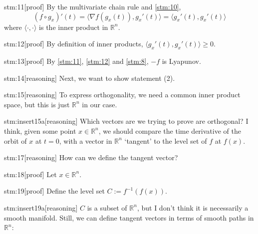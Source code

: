 \begin{stm}{stm:11}[proof]
By the multivariate chain rule and \ref{stm:10}, $$(f \circ g_x)'(t) = \langle \nabla f(g_x(t)), g_x'(t) \rangle = \langle g_x'(t), g_x'(t) \rangle$$ where $\langle \cdot, \cdot \rangle$ is the inner product in $\mathbb{R}^n$. 
\end{stm}

\begin{stm}{stm:12}[proof]
By definition of inner products, $\langle g_x'(t), g_x'(t) \rangle \ge 0$.
\end{stm}

\begin{stm}{stm:13}[proof]
By \ref{stm:11}, \ref{stm:12} and \ref{stm:8}, $-f$ is Lyapunov.
\end{stm}

\begin{stm}{stm:14}[reasoning]
Next, we want to show statement (2).
\end{stm}

\begin{stm}{stm:15}[reasoning]
To express orthogonality, we need a common inner product space, but this is just $\mathbb{R}^n$ in our case.
\end{stm}

\begin{stm}{stm:insert15a}[reasoning]
Which vectors are we trying to prove are orthogonal? I think, given some point $x \in \mathbb{R}^n$, we should compare the time derivative of the orbit of $x$ at $t=0$, with a vector in $\mathbb{R}^n$ ‘tangent’ to the level set of $f$ at $f(x)$.
\end{stm}

\begin{stm}{stm:17}[reasoning]
How can we define the tangent vector?
\end{stm}

\begin{stm}{stm:18}[proof]
Let $x \in \mathbb{R}^n$.
\end{stm}

\begin{stm}{stm:19}[proof]
Define the level set $C := f^{-1}(f(x))$.
\end{stm}

\begin{stm}{stm:insert19a}[reasoning]
$C$ is a subset of $\mathbb{R}^n$, but I don't think it is necessarily a smooth manifold. Still, we can define tangent vectors in terms of smooth paths in $\mathbb{R}^n$:
\end{stm}

